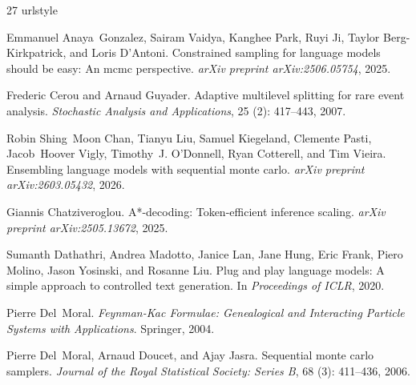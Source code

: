 \documentclass[11pt]{article}
\begin{document}
\begin{thebibliography}{27}
\providecommand{\natexlab}[1]{#1}
\providecommand{\url}[1]{\texttt{#1}}
\expandafter\ifx\csname urlstyle\endcsname\relax
  \providecommand{\doi}[1]{doi: #1}\else
  \providecommand{\doi}{doi: \begingroup \urlstyle{rm}\Url}\fi

Emmanuel Anaya~Gonzalez, Sairam Vaidya, Kanghee Park, Ruyi Ji, Taylor
  Berg-Kirkpatrick, and Loris D'Antoni.
\newblock Constrained sampling for language models should be easy: An mcmc
  perspective.
\newblock \emph{arXiv preprint arXiv:2506.05754}, 2025.

Frederic Cerou and Arnaud Guyader.
\newblock Adaptive multilevel splitting for rare event analysis.
\newblock \emph{Stochastic Analysis and Applications}, 25
  (2): 417--443, 2007.

Robin Shing~Moon Chan, Tianyu Liu, Samuel Kiegeland, Clemente Pasti,
  Jacob~Hoover Vigly, Timothy~J. O'Donnell, Ryan Cotterell, and Tim Vieira.
\newblock Ensembling language models with sequential monte carlo.
\newblock \emph{arXiv preprint arXiv:2603.05432}, 2026.

Giannis Chatziveroglou.
\newblock A*-decoding: Token-efficient inference scaling.
\newblock \emph{arXiv preprint arXiv:2505.13672}, 2025.

Sumanth Dathathri, Andrea Madotto, Janice Lan, Jane Hung, Eric Frank, Piero
  Molino, Jason Yosinski, and Rosanne Liu.
\newblock Plug and play language models: A simple approach to controlled text
  generation.
\newblock In \emph{Proceedings of ICLR}, 2020.

Pierre Del~Moral.
\newblock \emph{Feynman-Kac Formulae: Genealogical and Interacting Particle
  Systems with Applications}.
\newblock Springer, 2004.

Pierre Del~Moral, Arnaud Doucet, and Ajay Jasra.
\newblock Sequential monte carlo samplers.
\newblock \emph{Journal of the Royal Statistical Society: Series B},
  68 (3): 411--436, 2006.


\end{thebibliography}
\end{document}
